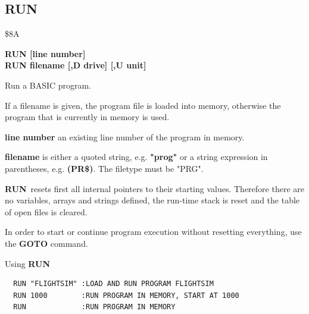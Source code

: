 \subsection{RUN}
\begin{description}[leftmargin=2cm,style=nextline]
\item [Token:] \$8A
\item [Format:] {\bf RUN [line number]} \\
                {\bf RUN filename [,D drive] [,U unit] }
\item [Usage:] Run a BASIC program.

   If a filename is given, the program file is loaded into
   memory, otherwise the program that is currently in memory
   is used.

   {\bf line number}
   an existing line number of the program in memory.

   {\bf filename} is either a quoted string, e.g. {\bf "prog"} or
   a string expression in parentheses, e.g. {\bf (PR\$)}.
   The filetype must be "PRG".

   \drivedefinition

   \unitdefinition

   {\bf RUN} resets first all internal pointers to their
   starting values. Therefore there are no variables, arrays
   and strings defined, the run-time stack is reset and the
   table of open files is cleared.

\item [Remarks:]
   In order to start or continue program execution without
   resetting everything, use the {\bf GOTO} command.

\item [Example:] Using {\bf RUN}
\begin{tcolorbox}[colback=black,coltext=white]
\verbatimfont{\codefont}
\begin{verbatim}
  RUN "FLIGHTSIM" :LOAD AND RUN PROGRAM FLIGHTSIM
  RUN 1000        :RUN PROGRAM IN MEMORY, START AT 1000
  RUN             :RUN PROGRAM IN MEMORY
\end{verbatim}
\end{tcolorbox}
\end{description}





\newpage
